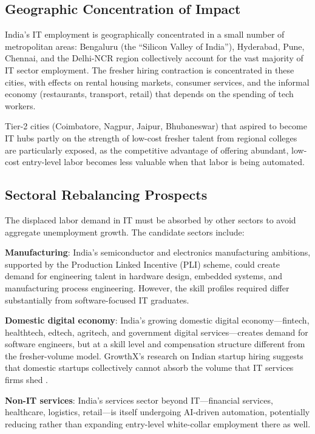 \documentclass[conference]{IEEEtran}
\begin{document}
\subsection{Geographic Concentration of Impact}

India's IT employment is geographically concentrated in a small number of metropolitan areas: Bengaluru (the ``Silicon Valley of India''), Hyderabad, Pune, Chennai, and the Delhi-NCR region collectively account for the vast majority of IT sector employment. The fresher hiring contraction is concentrated in these cities, with effects on rental housing markets, consumer services, and the informal economy (restaurants, transport, retail) that depends on the spending of tech workers.

Tier-2 cities (Coimbatore, Nagpur, Jaipur, Bhubaneswar) that aspired to become IT hubs partly on the strength of low-cost fresher talent from regional colleges are particularly exposed, as the competitive advantage of offering abundant, low-cost entry-level labor becomes less valuable when that labor is being automated.

\subsection{Sectoral Rebalancing Prospects}

The displaced labor demand in IT must be absorbed by other sectors to avoid aggregate unemployment growth. The candidate sectors include:

\textbf{Manufacturing}: India's semiconductor and electronics manufacturing ambitions, supported by the Production Linked Incentive (PLI) scheme, could create demand for engineering talent in hardware design, embedded systems, and manufacturing process engineering. However, the skill profiles required differ substantially from software-focused IT graduates.

\textbf{Domestic digital economy}: India's growing domestic digital economy---fintech, healthtech, edtech, agritech, and government digital services---creates demand for software engineers, but at a skill level and compensation structure different from the fresher-volume model. GrowthX's research on Indian startup hiring suggests that domestic startups collectively cannot absorb the volume that IT services firms shed \cite{growthx2024}.

\textbf{Non-IT services}: India's services sector beyond IT---financial services, healthcare, logistics, retail---is itself undergoing AI-driven automation, potentially reducing rather than expanding entry-level white-collar employment there as well.
\end{document}
